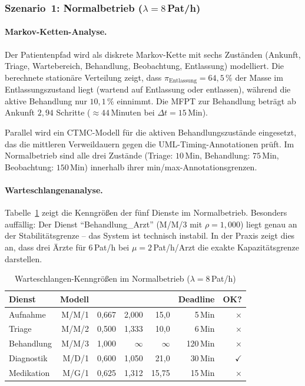 ﻿\documentclass[a4paper,12pt]{scrreprt}
\theoremstyle{definition}
\begin{document}
\subsubsection{Szenario~1: Normalbetrieb ($\lambda = 8$\,Pat/h)}

\paragraph{Markov-Ketten-Analyse.}
Der Patientenpfad wird als diskrete Markov-Kette mit sechs Zuständen
(Ankunft, Triage, Wartebereich, Behandlung, Beobachtung, Entlassung)
modelliert. Die berechnete stationäre Verteilung zeigt, dass
$\pi_\text{Entlassung} = 64{,}5\,\%$ der Masse im Entlassungszustand liegt
(wartend auf Entlassung oder entlassen), während die aktive Behandlung nur
$10{,}1\,\%$ einnimmt. Die MFPT zur Behandlung beträgt ab Ankunft
$2{,}94$ Schritte ($\approx 44$\,Minuten bei $\Delta t = 15$\,Min).

Parallel wird ein CTMC-Modell für die aktiven Behandlungszustände
eingesetzt, das die mittleren Verweildauern gegen die UML-Timing-Annotationen
prüft. Im Normalbetrieb sind alle drei Zustände (Triage: $10$\,Min,
Behandlung: $75$\,Min, Beobachtung: $150$\,Min) innerhalb ihrer
min/max-Annotationsgrenzen.

\paragraph{Warteschlangenanalyse.}
Tabelle~\ref{tab:wq-normal} zeigt die Kenngrößen der fünf Dienste im
Normalbetrieb. Besonders auffällig: Der Dienst ``Behandlung\_Arzt'' (M/M/3
mit $\rho = 1{,}000$) liegt genau an der Stabilitätsgrenze -- das System
ist technisch instabil. In der Praxis zeigt dies an, dass drei Ärzte
für $6$\,Pat/h bei $\mu = 2$\,Pat/h/Arzt die exakte Kapazitätsgrenze darstellen.

\begin{table}[H]
	\centering
	\begin{tabular}{@{}lrrrrrr@{}}
		\toprule
		\textbf{Dienst} & \textbf{Modell} & \boldmath{$\rho$} &
		\boldmath{$L$} & \boldmath{$W$\,(Min)} & \textbf{Deadline} & \textbf{OK?} \\
		\midrule
		Aufnahme        & M/M/1   & 0{,}667 & 2{,}000 &  15{,}0 & 5\,Min  & $\times$ \\
		Triage          & M/M/2   & 0{,}500 & 1{,}333 &  10{,}0 & 6\,Min  & $\times$ \\
		Behandlung      & M/M/3   & 1{,}000 & $\infty$& $\infty$& 120\,Min& $\times$ \\
		Diagnostik      & M/D/1   & 0{,}600 & 1{,}050 &  21{,}0 & 30\,Min & $\checkmark$ \\
		Medikation      & M/G/1   & 0{,}625 & 1{,}312 &  15{,}75& 15\,Min & $\times$ \\
		\bottomrule
	\end{tabular}
	\caption{Warteschlangen-Kenngrößen im Normalbetrieb ($\lambda=8$\,Pat/h)}
	\label{tab:wq-normal}
\end{table}
\end{document}

